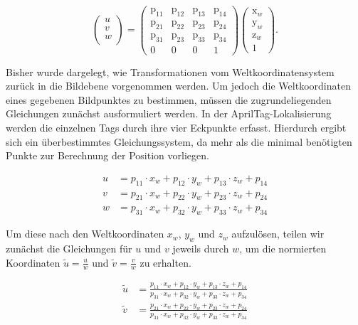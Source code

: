 \documentclass[ngerman]{article}    %
\theoremstyle{definition}
\begin{document}
\begin{equation}
    \begin{pmatrix}
        u \\
        v\\
        w\\
    \end{pmatrix} = \begin{pmatrix}
        \text{p}_{11} & \text{p}_{12} & \text{p}_{13} & \text{p}_{14} \\
        \text{p}_{21} & \text{p}_{22} & \text{p}_{23} & \text{p}_{24} \\
        \text{p}_{31} & \text{p}_{23} & \text{p}_{33} & \text{p}_{34} \\
        0 & 0 & 0 & 1
    \end{pmatrix}  
    \begin{pmatrix}
        \text{x}_w \\
        \text{y}_w \\
        \text{z}_w \\
        1
    \end{pmatrix}.
\end{equation}

Bisher wurde dargelegt, wie Transformationen vom Weltkoordinatensystem zurück in die Bildebene vorgenommen werden. Um jedoch die Weltkoordinaten eines gegebenen Bildpunktes zu bestimmen, müssen die zugrundeliegenden Gleichungen zunächst ausformuliert werden. In der AprilTag-Lokalisierung werden die einzelnen Tags durch ihre vier Eckpunkte erfasst. Hierdurch ergibt sich ein überbestimmtes Gleichungssystem, da mehr als die minimal benötigten Punkte zur Berechnung der Position vorliegen. 

\begin{align}
    u &= p_{11} \cdot x_w + p_{12} \cdot y_w + p_{13} \cdot z_w + p_{14} \\
    v &= p_{21} \cdot x_w + p_{22} \cdot y_w + p_{23} \cdot z_w + p_{24} \\
    w &= p_{31} \cdot x_w + p_{32} \cdot y_w + p_{33} \cdot z_w + p_{34}
\end{align}

Um diese nach den Weltkoordinaten \(x_w\), \(y_w\) und \(z_w\) aufzulösen, teilen wir zunächst die Gleichungen für \(u\) und \(v\) jeweils durch \(w\), um die normierten Koordinaten \(\tilde{u} = \frac{u}{w}\) und \(\tilde{v} = \frac{v}{w}\) zu erhalten.

\begin{align}
    \tilde{u} &= \frac{p_{11} \cdot x_w + p_{12} \cdot y_w + p_{13} \cdot z_w + p_{14}}{p_{31} \cdot x_w + p_{32} \cdot y_w + p_{33} \cdot z_w + p_{34}} \\
    \tilde{v} &= \frac{p_{21} \cdot x_w + p_{22} \cdot y_w + p_{23} \cdot z_w + p_{24}}{p_{31} \cdot x_w + p_{32} \cdot y_w + p_{33} \cdot z_w + p_{34}}
\end{align}
\end{document}
